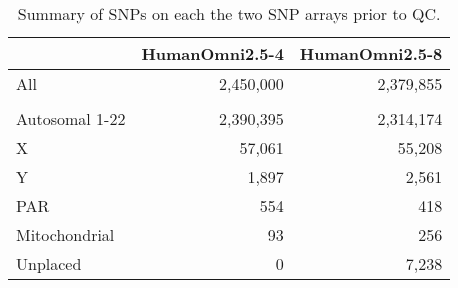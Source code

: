 \begin{table}[htp]
\centering
\begin{tabular}{l|rr}
\hline
               & HumanOmni2.5-4 & HumanOmni2.5-8 \\ \hline
All            & 2,450,000      & 2,379,855      \\ \hline
               &                &                \\
Autosomal 1-22 & 2,390,395      & 2,314,174      \\
X              & 57,061         & 55,208         \\
Y              & 1,897          & 2,561          \\
PAR            & 554            & 418            \\
Mitochondrial  & 93             & 256            \\
Unplaced       & 0              & 7,238          \\ \hline
\end{tabular}
\caption{Summary of \glspl{SNP} on each the two \gls{SNP} arrays prior to \gls{QC}.}
\label{tab:chips_preQC_summary}
\end{table}